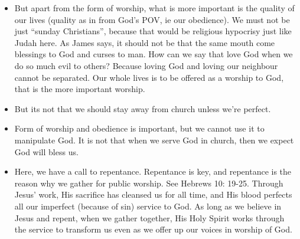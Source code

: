 \begin{itemize}
  \item{But apart from the form of worship, what is more important is the quality of our lives (quality as in from God’s POV, ie our obedience). We must not be just “sunday Christians”, because that would be religious hypocrisy just like Judah here. As James says, it should not be that the same mouth come blessings to God and curses to man. How can we say that love God when we do so much evil to others? Because loving God and loving our neighbour cannot be separated. Our whole lives is to be offered as a worship to God, that is the more important worship.}
  \item{But its not that we should stay away from church unless we’re perfect. }
  \item{Form of worship and obedience is important, but we cannot use it to manipulate God. It is not that when we serve God in church, then we expect God will bless us. }
  \item{Here, we have a call to repentance. Repentance is key, and repentance is the reason why we gather for public worship. See Hebrews 10: 19-25. Through Jesus’ work, His sacrifice has cleansed us for all time, and His blood perfects all our imperfect (because of sin) service to God. As long as we believe in Jesus and repent, when we gather together, His Holy Spirit works through the service to transform us even as we offer up our voices in worship of God.}
\end{itemize}